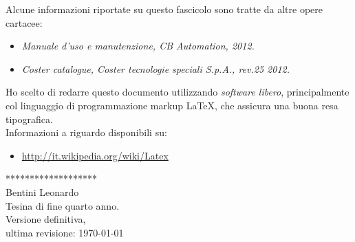 \documentclass[a4paper,14pt,twoside]{extarticle} %
\begin{document}
Alcune informazioni riportate su questo fascicolo sono tratte da altre opere cartacee:
\begin{itemize}
\item{\textit{Manuale d'uso e manutenzione, CB Automation, 2012.}}
\item{\textit{Coster catalogue, Coster tecnologie speciali S.p.A., rev.25 2012.}}
\end{itemize}

Ho scelto di redarre questo documento utilizzando \emph{software libero}, principalmente col linguaggio di programmazione markup \large \LaTeX,
 \normalsize che assicura una buona resa tipografica.\\
Informazioni a riguardo disponibili su:

\begin{itemize}
\item{\url{http://it.wikipedia.org/wiki/Latex}}
\end{itemize}

\newpage
\thispagestyle{empty}
\footnotesize
	*******************\\
	Bentini Leonardo\\
	Tesina di fine quarto anno.\\
	Versione definitiva,\\
	ultima revisione: \today
\end{document}
